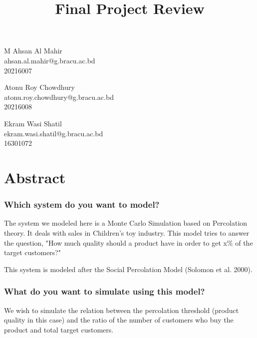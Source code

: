\documentclass[article, 11pt, a4paper, onesize]{memoir}
\title{\vspace{-3em}Final Project Review\vspace{-1em}}
\author{}
\begin{document}
\maketitle
\thispagestyle{empty}

\begin{minipage}[t]{.32\linewidth}
    M Ahsan Al Mahir\\
    ahsan.al.mahir@g.bracu.ac.bd\\
    20216007\\
\end{minipage}\hfill%
\begin{minipage}[t]{.38\linewidth}
    Atonu Roy Chowdhury\\
    atonu.roy.chowdhury@g.bracu.ac.bd\\
    20216008\\
\end{minipage}\hfill%
\begin{minipage}[t]{.29\linewidth}
    Ekram Wasi Shatil\\
    ekram.wasi.shatil@g.bracu.ac.bd\\
    16301072
\end{minipage}



\chapter{Abstract}

\subsection{Which system do you want to model?}

The system we modeled here is a Monte Carlo Simulation based on Percolation theory. It
deals with sales in Children's toy industry. This model tries to answer the question, "How
much quality should a product have in order to get x\% of the target customers?"

This system is modeled after the Social Percolation Model (Solomon et al. 2000).

\subsection{What do you want to simulate using this model?}

We wish to simulate the relation between the percolation threshold (product quality in
this case) and the ratio of the number of customers who buy the product and total target
customers.
\end{document}
